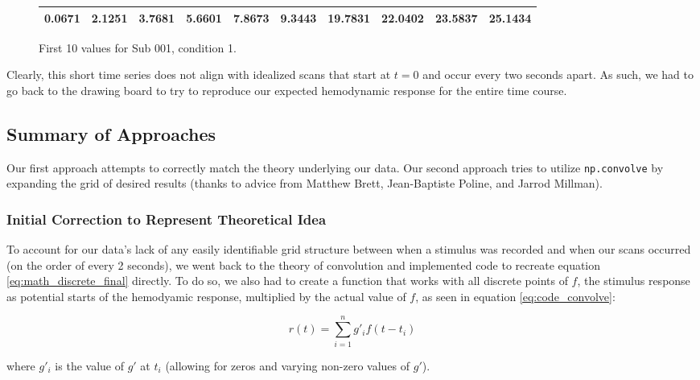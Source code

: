 \vspace{5mm}

\begin{figure}[ht]
\begin{center}
\begin{tabular}{|cccccccccc|}
  \hline
0.0671 &
2.1251 &
3.7681 &
5.6601 &
7.8673 &
9.3443 &
19.7831 &
22.0402 &
23.5837 &
25.1434 \\
 \hline

  \end{tabular}
   \caption{First 10 values for Sub 001, condition 1.}
  \label{table:cond1}
\end{center}
\end{figure}
 
Clearly, this short time series does not align with idealized scans that 
start at $t=0$ and occur every two seconds apart. As such, we had to go back 
to the drawing board to try to reproduce our expected hemodynamic response for 
the entire time course.


\subsection{Summary of Approaches}
Our first approach attempts to correctly match the theory underlying our data. 
Our second approach tries to utilize \texttt{np.convolve} by expanding the 
grid of desired results (thanks to advice from  Matthew Brett, Jean-Baptiste 
Poline, and Jarrod Millman).


\subsubsection{Initial Correction to Represent Theoretical Idea}
To account for our data's lack of any easily identifiable grid structure 
between when a stimulus was recorded and when our scans occurred (on the 
order of every 2 seconds), we went back to the theory of convolution and 
implemented code to recreate equation \ref{eq:math_discrete_final} directly. 
To do so, we also had to create a function that works with all discrete points 
of $f$, the stimulus response as potential starts of the hemodyamic response, 
multiplied by the actual value of $f$, as seen in equation 
\ref{eq:code_convolve}:

\begin{equation} \label{eq:code_convolve}
r(t)= \sum_{i=1}^n g'_{i} f(t-t_i)
\end{equation}

where $g'_{i}$ is the value of $g'$ at $t_i$ (allowing for zeros and varying 
non-zero values of $g'$).



